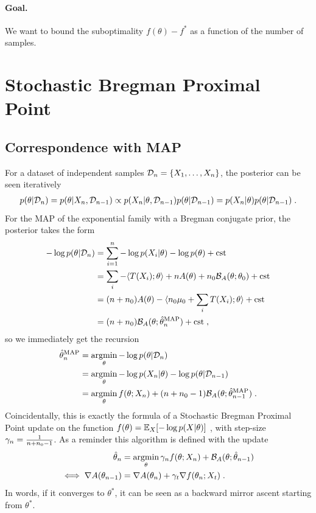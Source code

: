 \documentclass{article}
\newcommand{\logpart}{A}
\newcommand{\bregman}{\cB_\logpart}
\newcommand{\natp}{\theta}
\newcommand{\lr}{\gamma} %
\begin{document}
\paragraph{Goal.} We want to bound the suboptimality $f(\natp) - f^*$ as a function of the number of samples. 

\section{Stochastic Bregman Proximal Point}
\subsection{Correspondence with MAP}
For a dataset of independent samples ${\mathcal D}_n = \{X_1,\dots,X_n\}$, the posterior can be seen iteratively
\begin{align}
	p(\natp |\cD_n)
	=p(\natp|X_n,\cD_{n-1})
	\propto p(X_n|\natp,\cD_{n-1}) p(\natp|\cD_{n-1})
	=p(X_n|\natp)p(\natp |\cD_{n-1}) \; .
\end{align}
For the MAP of the exponential family with a Bregman conjugate prior, the posterior takes the form
\begin{align}
	- \log p(\natp | \cD_n) 
	&= \sum_{i=1}^n -\log p(X_i | \natp) - \log p(\natp) + \cst\\
	&= \sum_i - \langle T(X_i) ; \natp \rangle  + n \logpart(\natp) + n_0 \bregman(\natp ; \natp_0) +\cst \\
	&= (n+n_0)\logpart(\natp)  - \langle n_0 \mu_0 + \sum_i T(X_i) ; \natp \rangle + \cst \\
	&= (n+n_0) \bregman(\natp; \hat \natp_n^\text{MAP}) + \cst \; ,
\end{align}
so we immediately get the recursion
\begin{align}
    \hat \natp_n^\text{MAP}
    &= \argmin_\natp - \log p(\natp | \cD_n) \\
    &= \argmin_\natp - \log p(X_n|\natp) - \log p(\natp | \cD_{n-1}) \\
    &= \argmin_\natp f(\natp; X_{n}) + (n+n_0 - 1) \bregman(\natp; \hat \natp_{n-1}^\text{MAP})  \; .
    \label{eq:SBPP}
\end{align} 
Coincidentally, this is exactly the formula of a Stochastic Bregman Proximal Point update on the function $f(\natp) = \E_X[-\log p(X|\natp)]$ , with step-size $\lr_n = \inv{n+n_0 -1}$. As a reminder this algorithm is defined with the update
\begin{align}
	 \hat \natp_n
    &= \argmin_\natp \lr_n f(\natp; X_{n}) + \bregman(\natp; \hat \natp_{n-1}) \\
    \iff \nabla \logpart(\natp_{n-1}) &= \nabla\logpart(\natp_n) + \lr_t \nabla f(\natp_n ; X_t) \; .
\end{align}
In words, if it converges to $\natp^*$, it can be seen as a backward mirror ascent starting from $\natp^*$.
\end{document}
